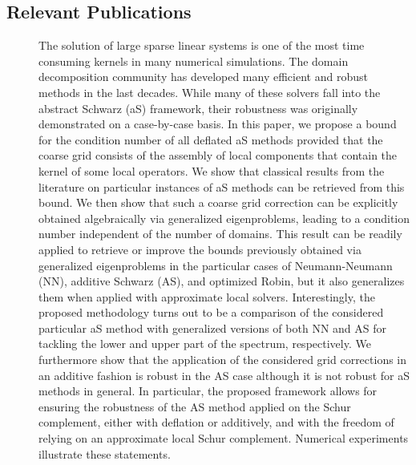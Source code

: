 \subsection{Relevant Publications}
\label{sec:Composyx:publications}

\begin{description}
        \item[]
        The solution of large sparse linear systems is one of the most time consuming kernels in many numerical simulations. The domain decomposition community has developed many efficient and robust methods in the last decades. While many of these solvers fall into the abstract Schwarz (aS) framework, their robustness was originally demonstrated on a case-by-case basis. In this paper, we propose a bound for the condition number of all deflated aS methods provided that the coarse grid consists of the assembly of local components that contain the kernel of some local operators. We show that classical results from the literature on particular instances of aS methods can be retrieved from this bound. We then show that such a coarse grid correction can be explicitly obtained algebraically via generalized eigenproblems, leading to a condition number independent of the number of domains. This result can be readily applied to retrieve or improve the bounds previously obtained via generalized eigenproblems in the particular cases of Neumann-Neumann (NN), additive Schwarz (AS), and optimized Robin, but it also generalizes them when applied with approximate local solvers. Interestingly, the proposed methodology turns out to be a comparison of the considered particular aS method with generalized versions of both NN and AS for tackling the lower and upper part of the spectrum, respectively. We furthermore show that the application of the considered grid corrections in an additive fashion is robust in the AS case although it is not robust for aS methods in general. In particular, the proposed framework allows for ensuring the robustness of the AS method applied on the Schur complement, either with deflation or additively, and with the freedom of relying on an approximate local Schur complement. Numerical experiments illustrate these statements.
    \item[]

\end{description}
